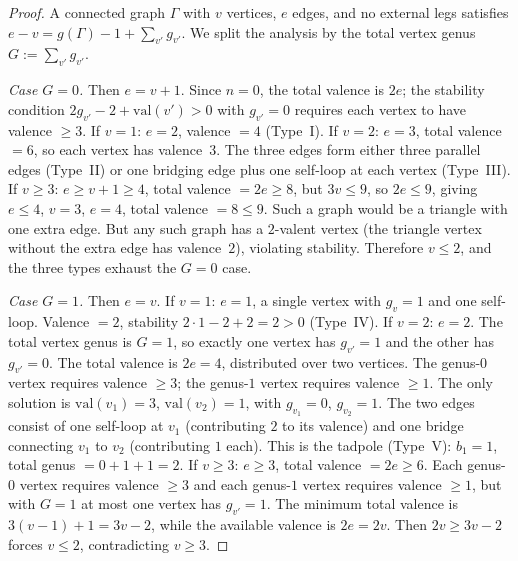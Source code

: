 \begin{proof}
A connected graph $\Gamma$ with $v$ vertices, $e$ edges, and no
external legs satisfies $e - v = g(\Gamma) - 1 + \sum_{v'} g_{v'}$.
We split the analysis by the total vertex genus
$G := \sum_{v'} g_{v'}$.

\emph{Case $G = 0$.} Then $e = v + 1$.
Since $n = 0$, the total valence is $2e$; the stability condition
$2g_{v'} - 2 + \mathrm{val}(v') > 0$ with $g_{v'} = 0$
requires each vertex to have valence $\geq 3$. If $v = 1$:
$e = 2$, valence $= 4$ (Type~I). If $v = 2$: $e = 3$, total
valence $= 6$, so each vertex has valence~$3$. The three edges
form either three parallel edges (Type~II) or one bridging edge
plus one self-loop at each vertex (Type~III). If $v \geq 3$:
$e \geq v + 1 \geq 4$, total valence $= 2e \geq 8$, but
$3v \leq 9$, so $2e \leq 9$, giving $e \leq 4$, $v = 3$,
$e = 4$, total valence $= 8 \leq 9$. Such a graph would be a
triangle with one extra edge. But any such graph has a
$2$-valent vertex (the triangle vertex without the extra edge
has valence~$2$), violating stability. Therefore $v \leq 2$,
and the three types exhaust the $G = 0$ case.

\emph{Case $G = 1$.} Then $e = v$.
If $v = 1$: $e = 1$, a single vertex with $g_v = 1$ and one
self-loop. Valence $= 2$, stability
$2 \cdot 1 - 2 + 2 = 2 > 0$ (Type~IV).
If $v = 2$: $e = 2$. The total vertex genus is $G = 1$, so
exactly one vertex has $g_{v'} = 1$ and the other has
$g_{v'} = 0$. The total valence is $2e = 4$, distributed over
two vertices. The genus-$0$ vertex requires
valence $\geq 3$; the genus-$1$ vertex requires valence $\geq 1$.
The only solution is $\mathrm{val}(v_1) = 3$,
$\mathrm{val}(v_2) = 1$, with $g_{v_1} = 0$, $g_{v_2} = 1$.
The two edges consist of one self-loop at $v_1$ (contributing
$2$ to its valence) and one bridge connecting $v_1$ to $v_2$
(contributing $1$ each). This is the tadpole (Type~V):
$b_1 = 1$, total genus $= 0 + 1 + 1 = 2$.
If $v \geq 3$: $e \geq 3$, total valence $= 2e \geq 6$.
Each genus-$0$ vertex requires valence $\geq 3$ and each
genus-$1$ vertex requires valence $\geq 1$, but with $G = 1$
at most one vertex has $g_{v'} = 1$. The minimum total valence
is $3(v-1) + 1 = 3v - 2$, while the available valence is
$2e = 2v$. Then $2v \geq 3v - 2$ forces $v \leq 2$,
contradicting $v \geq 3$.


\end{proof}

